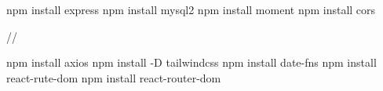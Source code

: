 npm install express
npm install mysql2
npm install moment
npm install cors


//

npm install axios
npm install -D tailwindcss
npm install date-fns
npm install react-rute-dom
npm install react-router-dom 




